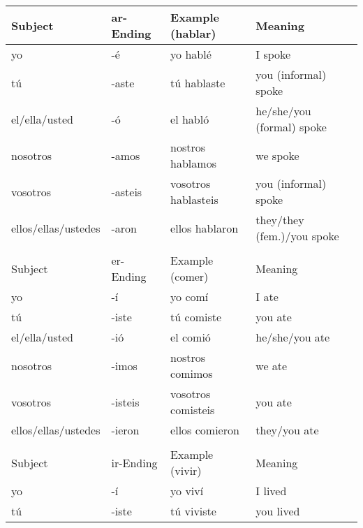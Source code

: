 \documentclass[a4paper,12pt]{article}
\begin{document}
\begin{table}[H]
\centering
\begin{tabular}{llll}
  Subject             & ar-Ending & Example (hablar)    & Meaning                    \\
  \toprule
  yo                  & -é        & yo hablé            & I spoke                    \\
  tú                  & -aste     & tú hablaste         & you (informal) spoke       \\
  el/ella/usted       & -ó        & el habló            & he/she/you (formal) spoke  \\
  nosotros            & -amos     & nostros hablamos    & we spoke                  \\
  vosotros            & -asteis   & vosotros hablasteis & you (informal) spoke       \\
  ellos/ellas/ustedes & -aron     & ellos hablaron      & they/they (fem.)/you spoke \\
  \midrule
                      &           &                     &                            \\
  Subject             & er-Ending & Example (comer)     & Meaning                    \\
  \toprule
  yo                  & -í        & yo comí             & I ate                      \\
  tú                  & -iste     & tú comiste          & you ate                    \\
  el/ella/usted       & -ió       & el comió            & he/she/you ate             \\
  nosotros            & -imos     & nostros comimos     & we ate                     \\
  vosotros            & -isteis   & vosotros comisteis  & you ate                    \\
  ellos/ellas/ustedes & -ieron    & ellos comieron      & they/you ate               \\
  \midrule
                      &           &                     &                            \\
  Subject             & ir-Ending & Example (vivir)     & Meaning                    \\
  \toprule
  yo                  & -í        & yo viví             & I lived                    \\
  tú                  & -iste     & tú viviste          & you lived                  \\

\end{tabular}
\end{table}
\end{document}
